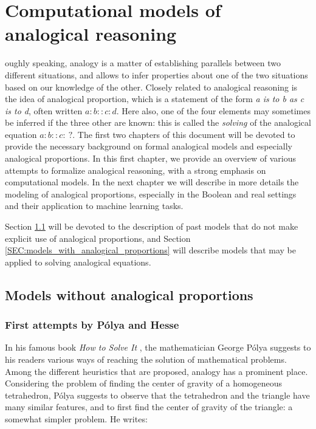 \chapter{Computational models of analogical reasoning}
\label{CHAP:computational_models_of_analogical_reasoning}


oughly speaking, analogy is a matter of establishing parallels
between two different situations, and allows to infer properties about one of
the two situations based on our knowledge of the other. Closely related to
analogical reasoning is the idea of analogical proportion, which is a statement
of the form \textit{a is to b as c is to d}, often written $a:b::c:d$. Here
also, one of the four elements may sometimes be inferred if the three other are
known: this is called the \textit{solving} of the analogical equation
$a:b::c:~?$. The first two chapters of this document will be devoted to provide
the necessary background on formal analogical models and especially analogical
proportions. In this first chapter, we provide an overview of various attempts
to formalize analogical reasoning, with a strong emphasis on computational
models. In the next chapter we will describe in more details the modeling of
analogical proportions, especially in the Boolean and real settings and their
application to machine learning tasks.

Section \ref{SEC:models_without_proportions} will be devoted to the description
of past models that do not make explicit use of analogical proportions, and
Section \ref{SEC:models_with_analogical_proportions} will describe models that
may be applied to solving analogical equations.

\section{Models without analogical proportions}
\label{SEC:models_without_proportions}

\subsection{First attempts by P\'olya and Hesse}

In his famous book \textit{How to Solve It} \cite{Pol45}, the mathematician
George P\'olya suggests to his readers various ways of reaching the solution
of mathematical problems. Among the different heuristics that are
proposed, analogy has a prominent place. Considering the problem of finding
the center of gravity of a homogeneous tetrahedron, P\'olya suggests to observe
that the tetrahedron and the triangle have many similar features, and to first
find the center of gravity of the triangle: a somewhat simpler problem. He
writes:


